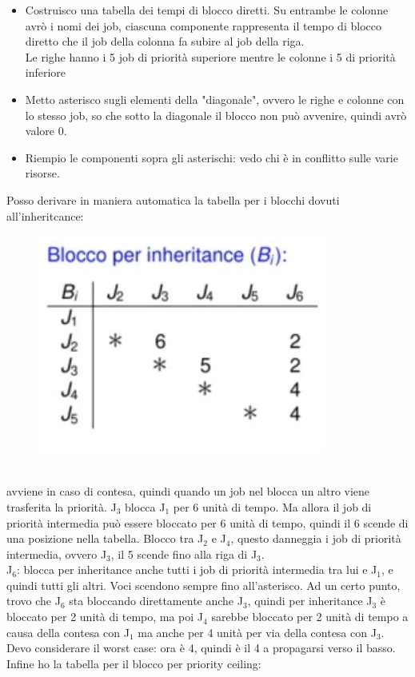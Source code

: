 \documentclass[12pt, oneside]{extbook}
\begin{document}
\begin{itemize}
\item Costruisco una tabella dei tempi di blocco diretti. Su entrambe le colonne avrò i nomi dei job, ciascuna componente rappresenta il tempo di blocco diretto che il job della colonna fa subire al job della riga.\\ Le righe hanno i 5 job di priorità superiore mentre le colonne i 5 di priorità inferiore
\item Metto asterisco sugli elementi della "diagonale", ovvero le righe e colonne con lo stesso job, so che sotto la diagonale il blocco non può avvenire, quindi avrò valore 0.
\item Riempio le componenti sopra gli asterischi: vedo chi è in conflitto sulle varie risorse.
\end{itemize}
Posso derivare in maniera automatica la tabella per i blocchi dovuti all'inheritcance: 
\begin{figure}[!h]
\centering
\includegraphics[scale=0.4]{immagini/image-030.jpg}
\end{figure}
\\avviene in caso di contesa, quindi quando un job nel blocca un altro viene trasferita la priorità. J$_{3}$ blocca J$_{1}$ per 6 unità di tempo. Ma allora il job di priorità intermedia può essere bloccato per 6 unità di tempo, quindi il 6 scende di una posizione nella tabella. Blocco tra J$_{2}$ e J$_{4}$, questo danneggia i job di priorità intermedia, ovvero J$_{3}$, il 5 scende fino alla riga di J$_{3}$.\\ J$_{6}$: blocca per inheritance anche tutti i job di priorità intermedia tra lui e J$_{1}$, e quindi tutti gli altri. Voci scendono sempre fino all'asterisco. Ad un certo punto, trovo che J$_{6}$ sta bloccando direttamente anche J$_{3}$, quindi per inheritance J$_{3}$ è bloccato per 2 unità di tempo, ma poi J$_{4}$ sarebbe bloccato per 2 unità di tempo a causa della contesa con J$_{1}$ ma anche per 4 unità per via della contesa con J$_{3}$. Devo considerare il worst case: ora è 4, quindi è il 4 a propagarsi verso il basso.\\ Infine ho la tabella per il blocco per priority ceiling:\\
\end{document}
